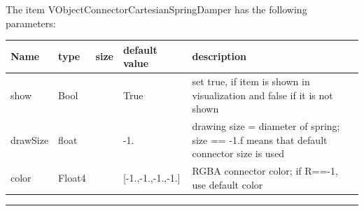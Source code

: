 The item VObjectConnectorCartesianSpringDamper has the following parameters:\vspace{-1cm}\\ 
\begin{center}
  \footnotesize
  \begin{longtable}{| p{4.5cm} | p{2.5cm} | p{0.5cm} | p{2.5cm} | p{6cm} |}
    \hline
    \bf Name & \bf type & \bf size & \bf default value & \bf description \\ \hline
    show &     Bool &      &     True &     set true, if item is shown in visualization and false if it is not shown\\ \hline
    drawSize &     float &      &     -1. &     drawing size = diameter of spring; size == -1.f means that default connector size is used\\ \hline
    color &     Float4 &      &     [-1.,-1.,-1.,-1.] &     RGBA connector color; if R==-1, use default color\\ \hline
	  \end{longtable}
	\end{center}
\par\noindent\rule{\textwidth}{0.4pt}
\label{description_ObjectConnectorCartesianSpringDamper}
